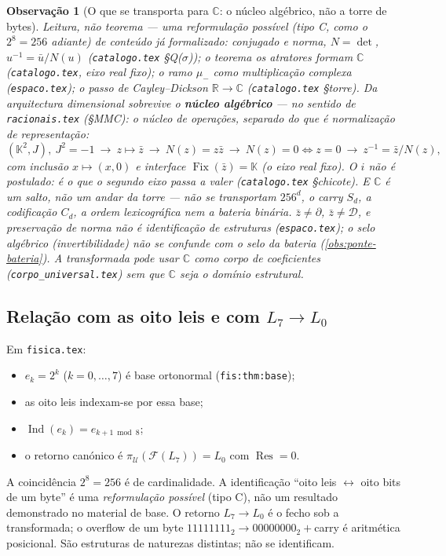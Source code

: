 \documentclass[11pt,a4paper]{article}
\newtheorem{observacao}{Observação}
\begin{document}
\begin{observacao}[O que se transporta para \(\mathbb C\): o núcleo algébrico, não a torre de bytes]
\label{obs:nucleo-algebrico}
Leitura, não teorema --- uma \emph{reformulação possível} (tipo C, como o \(2^8=256\) adiante) de conteúdo já formalizado: conjugado e norma, \(N=\det\), \(u^{-1}=\bar u/N(u)\) (\texttt{catalogo.tex} §Q(\(\sigma\))); o teorema \emph{os atratores formam} \(\mathbb C\) (\texttt{catalogo.tex}, eixo real fixo); o ramo \(\mu_-\) como multiplicação complexa (\texttt{espaco.tex}); o passo de Cayley--Dickson \(\mathbb R\to\mathbb C\) (\texttt{catalogo.tex} §torre).
Da arquitectura dimensional sobrevive o \textbf{núcleo algébrico} --- no sentido de \texttt{racionais.tex} (§MMC): o núcleo de operações, separado do que é normalização de representação:
\[
(\mathbb K^2,J),\ J^2=-1\ \to\ z\mapsto\bar z\ \to\ N(z)=z\bar z\ \to\ N(z)=0\iff z=0\ \to\ z^{-1}=\bar z/N(z),
\]
com inclusão \(x\mapsto(x,0)\) e interface \(\operatorname{Fix}(\bar z)=\mathbb K\) (o eixo real fixo). O \(i\) não é postulado: é o que o segundo eixo passa a valer (\texttt{catalogo.tex} §chicote). E \(\mathbb C\) é um \emph{salto}, não um andar da torre --- não se transportam \(256^d\), o carry \(S_d\), a codificação \(C_d\), a ordem lexicográfica nem a bateria binária. \(\bar z\neq\partial\), \(\bar z\neq\mathcal D\), e preservação de norma não é identificação de estruturas (\texttt{espaco.tex}); o selo algébrico (invertibilidade) não se confunde com o selo da bateria (\ref{obs:ponte-bateria}). A transformada pode usar \(\mathbb C\) como corpo de coeficientes (\texttt{corpo\_universal.tex}) sem que \(\mathbb C\) seja o domínio estrutural.
\end{observacao}

\subsection{Relação com as oito leis e com \(L_7\to L_0\)}

Em \texttt{fisica.tex}:
\begin{itemize}[leftmargin=1.5em]
\item \(e_k=2^k\) (\(k=0,\dots,7\)) é base ortonormal (\texttt{fis:thm:base});
\item as oito leis indexam-se por essa base;
\item \(\operatorname{Ind}(e_k)=e_{k+1\bmod 8}\);
\item o retorno canónico é \(\pi_{\mathcal U}(\mathcal F(L_7))=L_0\) com \(\operatorname{Res}=0\).
\end{itemize}
A coincidência \(2^8=256\) é de cardinalidade. A identificação ``oito leis \(\leftrightarrow\) oito bits de um byte'' é uma \emph{reformulação possível} (tipo C), não um resultado demonstrado no material de base. O retorno \(L_7\to L_0\) é o fecho sob a transformada; o overflow de um byte \(11111111_2\to 00000000_2+\)carry é aritmética posicional. São estruturas de naturezas distintas; não se identificam.
\end{document}
